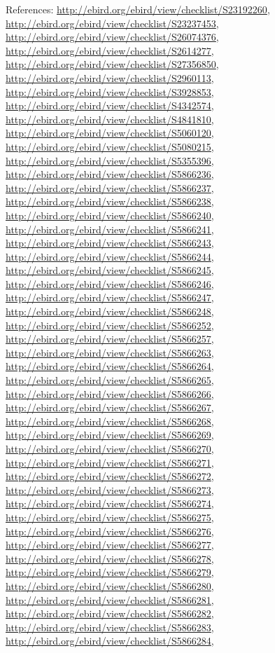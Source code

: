 \documentclass[9pt, article]{memoir}
\begin{document}
\begin{multicols}{2}
\vspace{6pt}References: 
\url{http://ebird.org/ebird/view/checklist/S23192260}, 
\url{http://ebird.org/ebird/view/checklist/S23237453}, 
\url{http://ebird.org/ebird/view/checklist/S26074376}, 
\url{http://ebird.org/ebird/view/checklist/S2614277}, 
\url{http://ebird.org/ebird/view/checklist/S27356850}, 
\url{http://ebird.org/ebird/view/checklist/S2960113}, 
\url{http://ebird.org/ebird/view/checklist/S3928853}, 
\url{http://ebird.org/ebird/view/checklist/S4342574}, 
\url{http://ebird.org/ebird/view/checklist/S4841810}, 
\url{http://ebird.org/ebird/view/checklist/S5060120}, 
\url{http://ebird.org/ebird/view/checklist/S5080215}, 
\url{http://ebird.org/ebird/view/checklist/S5355396}, 
\url{http://ebird.org/ebird/view/checklist/S5866236}, 
\url{http://ebird.org/ebird/view/checklist/S5866237}, 
\url{http://ebird.org/ebird/view/checklist/S5866238}, 
\url{http://ebird.org/ebird/view/checklist/S5866240}, 
\url{http://ebird.org/ebird/view/checklist/S5866241}, 
\url{http://ebird.org/ebird/view/checklist/S5866243}, 
\url{http://ebird.org/ebird/view/checklist/S5866244}, 
\url{http://ebird.org/ebird/view/checklist/S5866245}, 
\url{http://ebird.org/ebird/view/checklist/S5866246}, 
\url{http://ebird.org/ebird/view/checklist/S5866247}, 
\url{http://ebird.org/ebird/view/checklist/S5866248}, 
\url{http://ebird.org/ebird/view/checklist/S5866252}, 
\url{http://ebird.org/ebird/view/checklist/S5866257}, 
\url{http://ebird.org/ebird/view/checklist/S5866263}, 
\url{http://ebird.org/ebird/view/checklist/S5866264}, 
\url{http://ebird.org/ebird/view/checklist/S5866265}, 
\url{http://ebird.org/ebird/view/checklist/S5866266}, 
\url{http://ebird.org/ebird/view/checklist/S5866267}, 
\url{http://ebird.org/ebird/view/checklist/S5866268}, 
\url{http://ebird.org/ebird/view/checklist/S5866269}, 
\url{http://ebird.org/ebird/view/checklist/S5866270}, 
\url{http://ebird.org/ebird/view/checklist/S5866271}, 
\url{http://ebird.org/ebird/view/checklist/S5866272}, 
\url{http://ebird.org/ebird/view/checklist/S5866273}, 
\url{http://ebird.org/ebird/view/checklist/S5866274}, 
\url{http://ebird.org/ebird/view/checklist/S5866275}, 
\url{http://ebird.org/ebird/view/checklist/S5866276}, 
\url{http://ebird.org/ebird/view/checklist/S5866277}, 
\url{http://ebird.org/ebird/view/checklist/S5866278}, 
\url{http://ebird.org/ebird/view/checklist/S5866279}, 
\url{http://ebird.org/ebird/view/checklist/S5866280}, 
\url{http://ebird.org/ebird/view/checklist/S5866281}, 
\url{http://ebird.org/ebird/view/checklist/S5866282}, 
\url{http://ebird.org/ebird/view/checklist/S5866283}, 
\url{http://ebird.org/ebird/view/checklist/S5866284}, 

\end{multicols}
\end{document}
